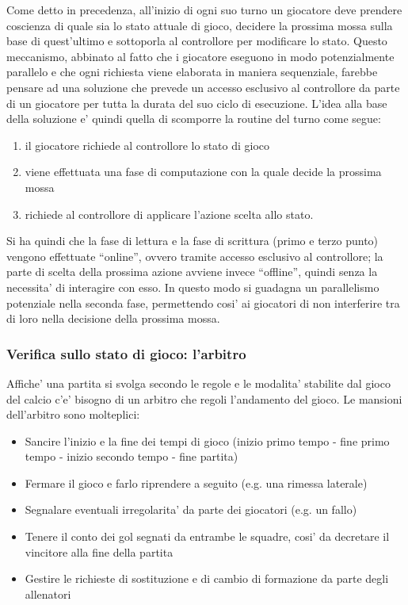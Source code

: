 Come detto in precedenza, all'inizio di ogni suo turno un giocatore deve prendere coscienza di quale sia lo stato attuale di gioco, decidere la prossima mossa sulla base di quest'ultimo e sottoporla al controllore per modificare lo stato. Questo meccanismo, abbinato al fatto che i giocatore eseguono in modo potenzialmente parallelo e che ogni richiesta viene elaborata in maniera sequenziale, farebbe pensare ad una soluzione che prevede un accesso esclusivo al controllore da parte di un giocatore per tutta la durata del suo ciclo di esecuzione. L'idea alla base della soluzione e' quindi quella di scomporre la routine del turno come segue:\\

\begin{enumerate}
	\item il giocatore richiede al controllore lo stato di gioco
	\item viene effettuata una fase di computazione con la quale decide la prossima mossa
	\item richiede al controllore di applicare l'azione scelta allo stato.
\end{enumerate}

Si ha quindi che la fase di lettura e la fase di scrittura (primo e terzo punto) vengono effettuate “online”, ovvero tramite accesso esclusivo al controllore; la parte di scelta della prossima azione avviene invece “offline”, quindi senza la necessita' di interagire con esso. In questo modo si guadagna un parallelismo potenziale nella seconda fase, permettendo cosi' ai giocatori di non interferire tra di loro nella decisione della prossima mossa.

\subsubsection{Verifica sullo stato di gioco: l'arbitro}
\label{sec:modello_verifica_arbitro}

Affiche' una partita si svolga secondo le regole e le modalita' stabilite dal gioco del calcio c'e' bisogno di un arbitro che regoli l'andamento del gioco. Le mansioni dell'arbitro sono molteplici:

\begin{itemize}
	\item Sancire l'inizio e la fine dei tempi di gioco (inizio primo tempo - fine primo tempo - inizio secondo tempo - fine partita)
	\item Fermare il gioco e farlo riprendere a seguito (e.g. una rimessa laterale)
	\item Segnalare eventuali irregolarita' da parte dei giocatori (e.g. un fallo)
	\item Tenere il conto dei gol segnati da entrambe le squadre, cosi' da decretare il vincitore alla fine della partita
	\item Gestire le richieste di sostituzione e di cambio di formazione da parte degli allenatori
\end{itemize}

